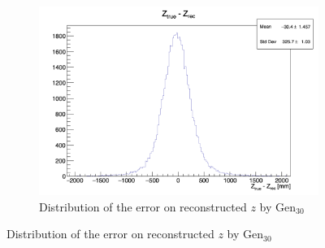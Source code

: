 \documentclass[../main.tex]{subfiles}
\begin{document}
\begin{figure}[ht]
\begin{subfigure}[t]{0.32\linewidth}
    \includegraphics[width=\linewidth]{images/jcnn/vic_cnn/cnn_delta_z.png}
    \caption{Distribution of the error on reconstructed $z$ by $\mathrm{Gen}_{30}$}
    \label{fig:jcnn:vic_cnn:cnn_delta_z}
  \end{subfigure}



\end{figure}
\end{document}

